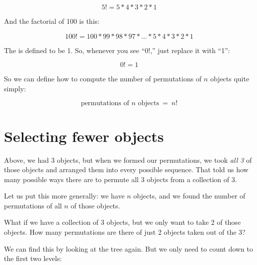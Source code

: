 \documentclass[../../../main.tex]{subfiles}
\begin{document}
\begin{equation*}
  5! = 5 * 4 * 3 * 2 * 1
\end{equation*}

\noindent
And the factorial of 100 is this:

\begin{equation*}
  100! = 100 * 99 * 98 * 97 * \ldots * 5 * 4 * 3 * 2 * 1
\end{equation*}

\noindent
The  is defined to be 1. So, whenever you see ``0!,'' just replace it with ``1'':

\begin{equation*}
  0! = 1
\end{equation*}

\noindent
So we can define how to compute the number of permutations of $n$ objects quite simply:

\begin{equation*}
  \text{permutations of $n$ objects}~=~n!
\end{equation*}


\section{Selecting fewer objects}

Above, we had 3 objects, but when we formed our permutations, we took \emph{all 3} of those objects and arranged them into every possible sequence. That told us how many possible ways there are to permute all 3 objects from a collection of 3.

Let us put this more generally: we have $n$ objects, and we found the number of permutations of all $n$ of those objects. 

What if we have a collection of 3 objects, but we only want to take 2 of those objects. How many permutations are there of just 2 objects taken out of the 3?

We can find this by looking at the tree again. But we only need to count down to the first two levels:
\end{document}
